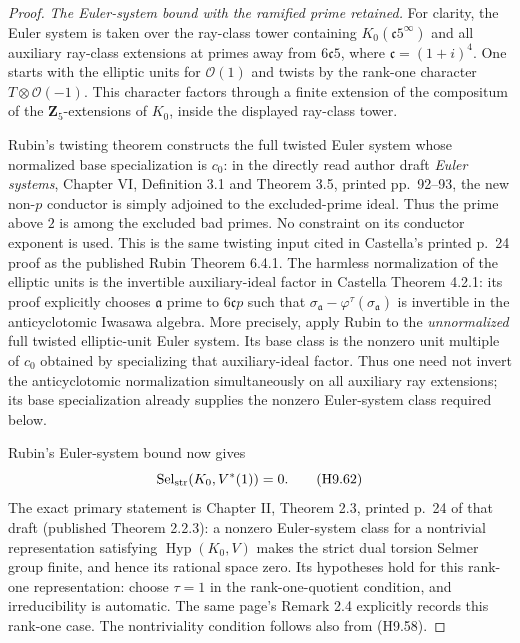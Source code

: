 \documentclass[11pt,a4paper]{article}
\begin{document}
\begin{proof}
\emph{The Euler-system bound with the ramified prime retained.}
For clarity, the Euler system is taken over the ray-class tower
containing $K_0(\mathfrak c5^\infty)$ and all auxiliary ray-class
extensions at primes away from $6\mathfrak c5$, where
$\mathfrak c=(1+i)^4$. One starts with the elliptic units for
$\mathcal O(1)$ and twists by the rank-one character
$T\otimes\mathcal O(-1)$. This character factors through a finite
extension of the compositum of the $\mathbf Z_5$-extensions of
$K_0$, inside the displayed ray-class tower.

Rubin's twisting theorem constructs the full twisted Euler system
whose normalized base specialization is $c_0$: in the directly read author draft
\emph{Euler systems}, Chapter VI, Definition 3.1 and Theorem 3.5,
printed pp.~92--93, the new non-$p$ conductor is simply adjoined
to the excluded-prime ideal. Thus the prime above $2$ is among
the excluded bad primes. No constraint on its conductor exponent
is used. This is the same twisting input cited in Castella's
printed p.~24 proof as the published Rubin Theorem 6.4.1.
The harmless normalization of the elliptic units is the invertible
auxiliary-ideal factor in Castella Theorem 4.2.1: its proof explicitly
chooses $\mathfrak a$ prime to $6\mathfrak cp$ such that
$\sigma_{\mathfrak a}-\varphi^\tau(\sigma_{\mathfrak a})$
is invertible in the anticyclotomic Iwasawa algebra. More precisely,
apply Rubin to the \emph{unnormalized} full twisted elliptic-unit
Euler system. Its base class is the nonzero unit multiple of $c_0$
obtained by specializing that auxiliary-ideal factor. Thus one need
not invert the anticyclotomic normalization simultaneously on all
auxiliary ray extensions; its base specialization already supplies
the nonzero Euler-system class required below.

Rubin's Euler-system bound now gives
\[
           \operatorname{Sel}_{\rm str}(K_0,V^*(1))=0.
                                                               \tag{H9.62}
\]
The exact primary statement is Chapter II, Theorem 2.3, printed
p.~24 of that draft (published Theorem 2.2.3): a nonzero
Euler-system class for a nontrivial representation satisfying
$\operatorname{Hyp}(K_0,V)$ makes the strict dual torsion Selmer
group finite, and hence its rational space zero. Its hypotheses
hold for this rank-one representation: choose $\tau=1$ in the
rank-one-quotient condition, and irreducibility is automatic.
The same page's Remark 2.4 explicitly records this rank-one case.
The nontriviality condition follows also from (H9.58).


\end{proof}
\end{document}
